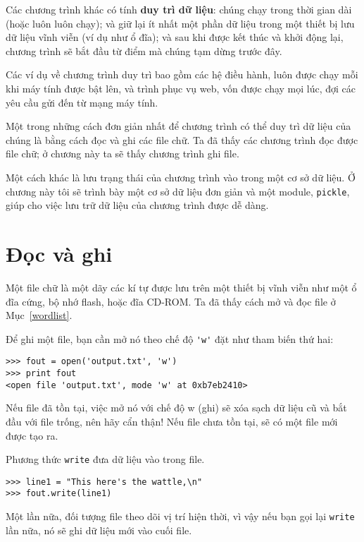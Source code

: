 \documentclass[11pt]{book}
\begin{document}
Các chương trình khác có tính {\bf duy trì dữ liệu}: chúng chạy
trong thời gian dài (hoặc luôn luôn chạy); và giữ lại ít nhất một
phần dữ liệu trong một thiết bị lưu dữ liệu vĩnh viễn (ví dụ như ổ đĩa);
và sau khi được kết thúc và khởi động lại, chương trình
sẽ bắt đầu từ điểm mà chúng tạm dừng trước đây.

Các ví dụ về chương trình duy trì bao gồm các hệ điều hành,
luôn được chạy mỗi khi máy tính được bật lên, và trình phục vụ
web, vốn được chạy mọi lúc, đợi các yêu cầu gửi đến từ
mạng máy tính.

Một trong những cách đơn giản nhất để chương trình có thể
duy trì dữ liệu của chúng là bằng cách đọc và ghi các file chữ.
Ta đã thấy các chương trình đọc được file chữ; ở chương này
ta sẽ thấy chương trình ghi file.

Một cách khác là lưu trạng thái của chương trình vào trong một
cơ sở dữ liệu. Ở chương này tôi sẽ trình bày một cơ sở dữ liệu
đơn giản và một module, {\tt pickle}, giúp cho việc lưu trữ dữ liệu
của chương trình được dễ dàng.



\section{Đọc và ghi}


Một file chữ là một dãy các kí tự được lưu trên một thiết bị
vĩnh viễn như một ổ đĩa cứng, bộ nhớ flash, hoặc đĩa CD-ROM. 
Ta đã thấy cách mở và đọc file ở Mục~\ref{wordlist}.


Để ghi một file, bạn cần mở nó theo chế độ
\verb"'w'" đặt như tham biến thứ hai:

\beforeverb
\begin{verbatim}
>>> fout = open('output.txt', 'w')
>>> print fout
<open file 'output.txt', mode 'w' at 0xb7eb2410>
\end{verbatim}
\afterverb
%
Nếu file đã tồn tại, việc mở nó với chế độ w (ghi) sẽ xóa sạch
dữ liệu cũ và bắt đầu với file trống, nên hãy cẩn thận!
Nếu file chưa tồn tại, sẽ có một file mới được tạo ra.

Phương thức {\tt write} đưa dữ liệu vào trong file.

\beforeverb
\begin{verbatim}
>>> line1 = "This here's the wattle,\n"
>>> fout.write(line1)
\end{verbatim}
\afterverb
%
Một lần nữa, đối tượng file theo dõi vị trí hiện thời, vì vậy
nếu bạn gọi lại {\tt write} lần nữa, nó sẽ ghi dữ liệu mới
vào cuối file.
\end{document}
